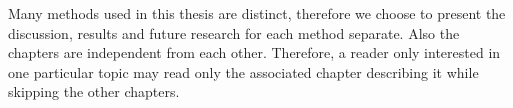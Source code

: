 Many methods used in this thesis are distinct, therefore we choose to present
the discussion, results and future research for each method separate.  Also the
chapters are independent from each other. Therefore, a reader only interested in
one particular topic may read only the associated chapter describing it while
skipping the other chapters.



